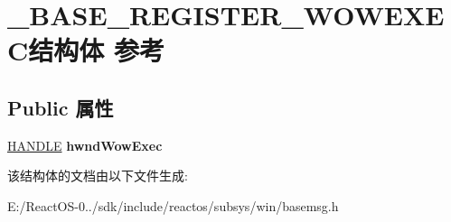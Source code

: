 \hypertarget{struct___b_a_s_e___r_e_g_i_s_t_e_r___w_o_w_e_x_e_c}{}\section{\+\_\+\+B\+A\+S\+E\+\_\+\+R\+E\+G\+I\+S\+T\+E\+R\+\_\+\+W\+O\+W\+E\+X\+E\+C结构体 参考}
\label{struct___b_a_s_e___r_e_g_i_s_t_e_r___w_o_w_e_x_e_c}
\subsection*{Public 属性}
\begin{DoxyCompactItemize}
\item 
\mbox{\label{struct___b_a_s_e___r_e_g_i_s_t_e_r___w_o_w_e_x_e_c_a7fce5c3f257d678b6f21103338106451}} 
\hyperlink{interfacevoid}{H\+A\+N\+D\+LE} {\bfseries hwnd\+Wow\+Exec}
\end{DoxyCompactItemize}


该结构体的文档由以下文件生成\+:\begin{DoxyCompactItemize}
\item 
E\+:/\+React\+O\+S-\/0../sdk/include/reactos/subsys/win/basemsg.\+h\end{DoxyCompactItemize}
